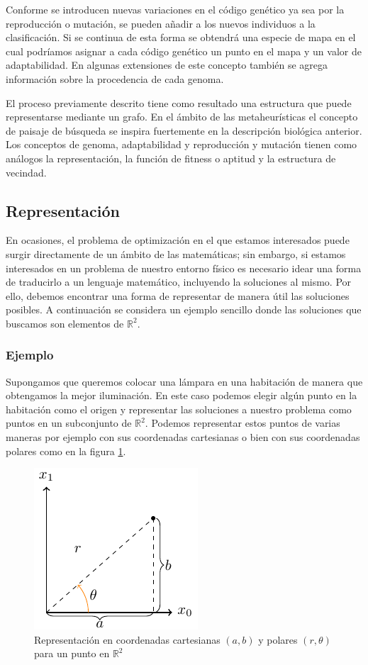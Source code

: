 Conforme se introducen nuevas variaciones en el código genético ya sea por la reproducción o mutación, se pueden añadir a los nuevos individuos a la clasificación. 
%
Si se continua de esta forma se obtendrá una especie de mapa en el cual podríamos asignar a cada código genético un punto en el mapa y un valor de adaptabilidad.
%
En algunas extensiones de este concepto también se agrega información sobre la procedencia de cada genoma.

El proceso previamente descrito tiene como resultado una estructura que puede representarse mediante un grafo. 
%
En el ámbito de las metaheurísticas el concepto de paisaje de búsqueda se inspira fuertemente en la descripción biológica anterior. 
%
Los conceptos de genoma, adaptabilidad y reproducción y mutación tienen como análogos la representación, la función de fitness o aptitud y la estructura de vecindad.   

\subsection{Representación}

En ocasiones, el problema de optimización en el que estamos interesados puede surgir directamente de un ámbito de las matemáticas;
%
sin embargo, si estamos interesados en un problema de nuestro entorno físico es necesario idear una forma de traducirlo a un lenguaje matemático, 
incluyendo la soluciones al mismo. 
%
Por ello, debemos encontrar una forma de representar de manera útil las soluciones posibles.
%
A continuación se considera un ejemplo sencillo donde las soluciones que buscamos son elementos de $\mathbb{R}^2$.
\subsubsection*{Ejemplo}
Supongamos que queremos colocar una lámpara en una habitación de manera que obtengamos la mejor iluminación. En este caso podemos elegir algún punto en la habitación como el origen y representar las soluciones a nuestro problema como puntos en un subconjunto de $\mathbb{R}^2$. Podemos representar estos puntos de varias maneras por ejemplo con sus coordenadas cartesianas o bien con sus coordenadas polares como en la figura \ref{fig:cartpol}.

\begin{figure}[H]
    \centering
    \includegraphics[scale=1.5]{Imagenes/repr_example.pdf}
    \caption{Representación en coordenadas cartesianas $(a,b)$ y polares $(r,\theta)$ para un punto  en $\mathbb{R}^2$}
    \label{fig:cartpol}
\end{figure}

